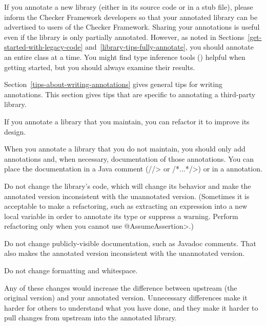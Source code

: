 If you annotate a new library (either in its source code or in a stub
file), please inform the Checker Framework
developers so that your annotated library can be advertised to users of the
Checker Framework.
Sharing your annotations is useful even if the library is only partially
annotated.
However, as noted in Sections~\ref{get-started-with-legacy-code} and~\ref{library-tips-fully-annotate}, you
should annotate an entire class at a time.
You might find type inference tools () helpful
when getting started, but you should always examine their results.



Section~\ref{tips-about-writing-annotations} gives general tips for writing
annotations.  This section gives tips that are specific to annotating a
third-party library.



If you annotate a library that you maintain, you can refactor it to improve
its design.

When you annotate a library that you do not maintain, you should only add
annotations and, when necessary, documentation of those annotations.  You
can place the documentation in a Java comment (\<//> or \</*...*/>) or in a
 annotation.

Do not change the library's code, which will change its behavior and make
the annotated version inconsistent with the unannotated version.
(Sometimes it is acceptable to make a refactoring, such as extracting an
expression into a new local variable in order to annotate its type or
suppress a warning.  Perform refactoring only when you cannot use
\<@AssumeAssertion>.)

Do not change publicly-visible documentation, such as Javadoc comments.
That also makes the annotated version inconsistent with the unannotated
version.

Do not change formatting and whitespace.

Any of these changes would increase the difference between upstream (the original
version) and your annotated version.  Unnecessary differences make it harder for others to
understand what you have done, and they make it harder to pull changes from
upstream into the annotated library.


